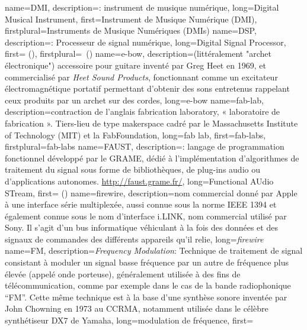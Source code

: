{
    name={DMI},
    description={\textit{}: instrument de musique numérique},
    long={Digital Musical Instrument},
    first={Instrument de Musique Numérique (DMI)},
    firstplural={Instruments de Musique Numériques (DMIs)}
}
{
    name={DSP},
    description={\textit{}: Processeur de signal numérique},
    long={Digital Signal Processor},
    first={ ()},
    firstplural={\glspluralsuffix\ (\glspluralsuffix)}
}
{
    name={e-bow},
    description={(littéralement "archet électronique") accessoire pour guitare inventé par Greg Heet en 1969, et commercialisé par \textit{Heet Sound Products}, fonctionnant comme un excitateur électromagnétique portatif permettant d'obtenir des sons entretenus rappelant ceux produits par un archet sur des cordes},
    long={e-bow}
}
{
    name={fab-lab},
    description={contraction de l'anglais fabrication laboratory, « laboratoire de fabrication ». Tiers-lieu de type \gls{makerspace} cadré par le Massachusetts Institute of Technology (MIT) et la FabFoundation},
    long={fab lab},
    first={fab-labs},
    firstplural={fab-labs}
}
{
    name={FAUST},
    description={\textit{}: langage de programmation fonctionnel développé par le \gls{GRAME}, dédié à l'implémentation d'algorithmes de traitement du signal sous forme de bibliothèques, de plug-ins audio ou d'applications autonomes. \url{http://faust.grame.fr/}},
    long={Functional AUdio STream},
    first={ ()}
}
{
    name={firewire},
    description={nom commercial donné par Apple à une interface série multiplexée, aussi connue sous la norme IEEE 1394 et également connue sous le nom d'interface i.LINK, nom commercial utilisé par Sony. Il s'agit d'un bus informatique véhiculant à la fois des données et des signaux de commandes des différents appareils qu'il relie},
    long={\textit{firewire}}
}
{
    name={FM},
    description={\textit{Frequency Modulation}: Technique de traitement de signal consistant à moduler un signal basse fréquence par un autre de fréquence plus élevée (appelé onde porteuse), généralement utilisée à des fins de télécommunication, comme par exemple dans le cas de la bande radiophonique ``FM''. Cette même technique est à la base d'une synthèse sonore inventée par John Chowning en 1973 au \gls{CCRMA}, notamment utilisée dans le célèbre synthétiseur DX7 de Yamaha},
    long={modulation de fréquence},
    first={}
}
